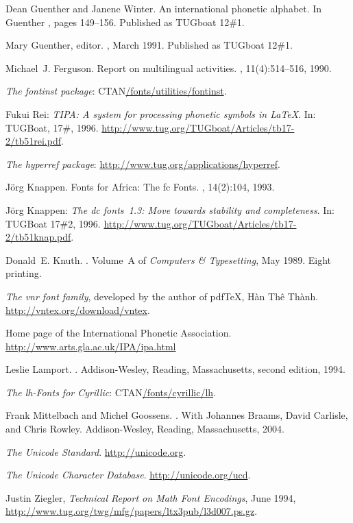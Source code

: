 \documentclass{ltxguide}[1994/11/20]
\providecommand{\Pkg}[1]{%
  \textsf{#1}}
\begin{document}
\begin{thebibliography}{99}
Dean Guenther and Janene Winter.
\newblock An international phonetic alphabet.
\newblock In Guenther \cite{proc:MGu91}, pages 149--156.
\newblock Published as {TUG}boat 12\#1.

Mary Guenther, editor.
, March 1991.
\newblock Published as {TUG}boat 12\#1.

Michael~J. Ferguson.
\newblock Report on multilingual activities.
, 11(4):514--516, 1990.

 \emph{The \Pkg{fontinst} package}:
  \textlangle CTAN\textrangle\url{/fonts/utilities/fontinst}.

 Fukui Rei:
  \emph{\textsl{TIPA}: A system for processing phonetic
      symbols in \LaTeX}.  In: TUGBoat, 17\#, 1996.
  \url{http://www.tug.org/TUGboat/Articles/tb17-2/tb51rei.pdf}.

 \emph{The \Pkg{hyperref} package}:
  \url{http://www.tug.org/applications/hyperref}.

J\"org Knappen.
\newblock Fonts for Africa: The fc Fonts.
, 14(2):104, 1993.

 J\"org Knappen:
  \emph{The \Pkg{dc} fonts~1.3: Move towards stability
      and completeness}.  In: TUGBoat 17\#2, 1996.
  \url{http://www.tug.org/TUGboat/Articles/tb17-2/tb51knap.pdf}.

Donald~E. Knuth.
.
\newblock Volume~A of {\em Computers \& {T}ypesetting\/},
  May 1989.
\newblock Eight printing.

 \emph{The \Pkg{vnr} font family}, developed by
   the author of pdf\TeX, {H\`an Th\^e\protect\llap{\raise 0.5ex\hbox{\'{\relax}}} Th\`anh}.
   \url{http://vntex.org/download/vntex}.

  Home page of the International Phonetic Association.
   \url{http://www.arts.gla.ac.uk/IPA/ipa.html}

Leslie Lamport.
.
\newblock Addison-Wesley, Reading, Massachusetts, second edition, 1994.

 \emph{The \Pkg{lh}-Fonts for Cyrillic}:
  \textlangle CTAN\textrangle\url{/fonts/cyrillic/lh}.

Frank Mittelbach and Michel Goossens.
.
\newblock With Johannes Braams, David Carlisle, and Chris Rowley.
\newblock Addison-Wesley, Reading, Massachusetts, 2004.

 \emph{The Unicode Standard}.
  \url{http://unicode.org}.

 \emph{The Unicode Character Database}.
  \url{http://unicode.org/ucd}.

 Justin Ziegler, \emph{Technical
    Report on Math Font Encodings}, June 1994,
  \url{http://www.tug.org/twg/mfg/papers/ltx3pub/l3d007.ps.gz}.

\end{thebibliography}
\end{document}
